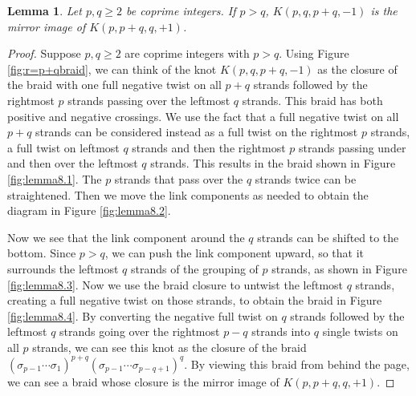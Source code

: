 \documentclass{amsart}
\newtheorem{lemma}{Lemma}
\begin{document}
\begin{lemma}\label{lem:makepthebigone}
Let $p, q\ge 2$ be coprime integers. If $p >q$, $K(p,q,p+q, -1)$ is the mirror image of $K(p, p+q, q, +1)$.
\end{lemma}

\begin{proof}
Suppose $p, q\ge 2$ are coprime integers with $p >q$. Using Figure \ref{fig:r=p+qbraid}, we can think of the knot $K(p,q,p+q, -1)$ as the closure of the braid with one full negative twist on all $p+q$ strands followed by the rightmost $p$ strands passing over the leftmost $q$ strands. This braid has both positive and negative crossings. We use the fact that a full negative twist on all $p+q$ strands can be considered instead as a full twist on the rightmost $p$ strands, a full twist on leftmost $q$ strands and then the rightmost $p$ strands passing under and then over the leftmost $q$ strands. This results in the braid shown in Figure \ref{fig:lemma8.1}. The $p$ strands that pass over the $q$ strands twice can be straightened. Then we move the link components as needed to obtain the diagram in Figure \ref{fig:lemma8.2}. 

Now we see that the link component around the $q$ strands can be shifted to the bottom. Since $p>q$, we can push the link component upward, so that it surrounds the leftmost $q$ strands of the grouping of $p$ strands, as shown in Figure \ref{fig:lemma8.3}. Now we use the braid closure to untwist the leftmost $q$ strands, creating a full negative twist on those strands, to obtain the braid in Figure \ref{fig:lemma8.4}. By converting the negative full twist on $q$ strands followed by the leftmost $q$ strands going over the rightmost $p-q$ strands into $q$ single twists on all $p$ strands, we can see this knot as the closure of the braid $(\sigma_{p-1} \cdots \sigma_1)^{p+q} (\sigma_{p-1} \cdots \sigma_{p-q+1})^q$. By viewing this braid from behind the page, we can see a braid whose closure is the mirror image of $K(p, p+q, q, +1)$.
\end{proof}
\end{document}
